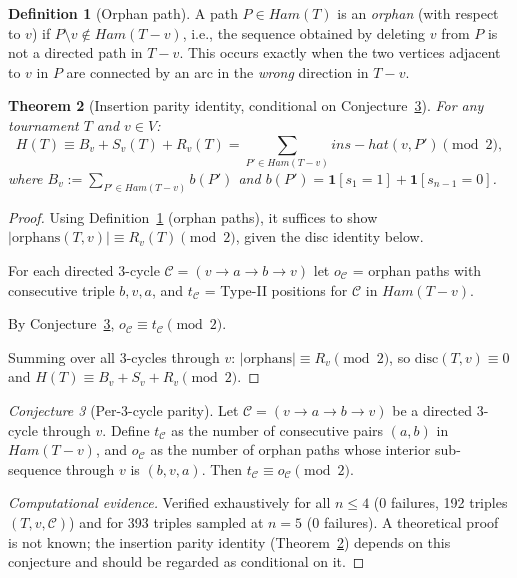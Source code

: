 \documentclass[12pt,reqno]{amsart}
\theoremstyle{plain}
\newtheorem{theorem}{Theorem}[section]
\theoremstyle{definition}
\newtheorem{definition}[theorem]{Definition}
\theoremstyle{remark}
\newtheorem{conjecture}[theorem]{Conjecture}
\newcommand{\Ham}{\mathrm{Ham}}
\newcommand{\inshat}{\widehat{\mathrm{ins}}}
\renewcommand{\Ham}{Ham}%
\renewcommand{\inshat}{ins-hat}%
\begin{document}
\begin{definition}[Orphan path]\label{def:orphan}
A path $P \in \Ham(T)$ is an \emph{orphan} (with respect to $v$) if
$P{\setminus}v \notin \Ham(T{-}v)$, i.e., the sequence obtained by deleting $v$
from $P$ is not a directed path in $T{-}v$. This occurs exactly when the two
vertices adjacent to $v$ in $P$ are connected by an arc in the \emph{wrong}
direction in $T{-}v$.
\end{definition}

\begin{theorem}[Insertion parity identity, conditional on Conjecture~\ref{lem:per_cycle_parity}]\label{thm:insertion}
For any tournament $T$ and $v \in V$:
\[
  H(T) \equiv B_v + S_v(T) + R_v(T)
  = \sum_{P'\in\Ham(T{-}v)} \inshat(v,P') \pmod{2},
\]
where $B_v := \sum_{P'\in\Ham(T{-}v)} b(P')$ and
$b(P') = \mathbf{1}[s_1{=}1] + \mathbf{1}[s_{n-1}{=}0]$.
\end{theorem}
\begin{proof}
Using Definition~\ref{def:orphan} (orphan paths), it suffices to show
$|\mathrm{orphans}(T,v)| \equiv R_v(T) \pmod{2}$, given the disc identity below.

For each directed 3-cycle $\mathcal{C}=(v{\to}a{\to}b{\to}v)$ let
$o_\mathcal{C}$ = orphan paths with consecutive triple $b,v,a$,
and $t_\mathcal{C}$ = Type-II positions for $\mathcal{C}$ in $\Ham(T{-}v)$.

By Conjecture~\ref{lem:per_cycle_parity}, $o_\mathcal{C} \equiv t_\mathcal{C} \pmod{2}$.

Summing over all 3-cycles through $v$:
$|\mathrm{orphans}| \equiv R_v \pmod{2}$,
so $\mathrm{disc}(T,v) \equiv 0$ and $H(T) \equiv B_v + S_v + R_v \pmod{2}$.
\end{proof}

\begin{conjecture}[Per-3-cycle parity]\label{lem:per_cycle_parity}
Let $\mathcal{C} = (v{\to}a{\to}b{\to}v)$ be a directed 3-cycle through $v$.
Define $t_\mathcal{C}$ as the number of consecutive pairs $(a,b)$ in $\Ham(T{-}v)$,
and $o_\mathcal{C}$ as the number of orphan paths whose interior sub-sequence
through $v$ is $(b,v,a)$. Then $t_\mathcal{C} \equiv o_\mathcal{C} \pmod{2}$.
\end{conjecture}
\begin{proof}[Computational evidence]
Verified exhaustively for all $n \leq 4$ (0 failures, 192 triples
$(T,v,\mathcal{C})$) and for 393 triples sampled at $n=5$ (0 failures).
A theoretical proof is not known; the insertion parity identity
(Theorem~\ref{thm:insertion}) depends on this conjecture and should be regarded
as conditional on it.
\end{proof}
\end{document}
